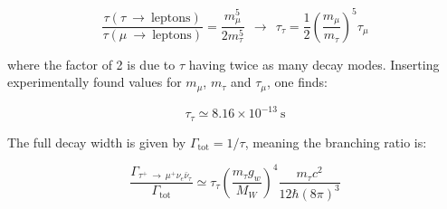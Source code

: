 \documentclass[11pt,a4paper]{article}
\begin{document}
\begin{equation}
	\frac{\tau(\tau\:\rightarrow\:\text{leptons})}{\tau(\mu\:\rightarrow\:\text{leptons})} = \frac{m_\mu^5}{2m_\tau^5} \:\:\longrightarrow\:\: \tau_\tau = \frac{1}{2}\left(\frac{m_\mu}{m_\tau}\right)^5\tau_\mu
\end{equation}

where the factor of 2 is due to $\tau$ having twice as many decay modes. Inserting experimentally found values for $m_\mu$, $m_\tau$ and $\tau_\mu$, one finds:

\begin{equation}
	\tau_\tau \simeq 8.16\times 10^{-13}\:\text{s}
\end{equation}

The full decay width is given by $\Gamma_{\text{tot}} = 1/\tau$, meaning the branching ratio is:

\begin{equation}
	\frac{\Gamma_{\tau^+ \:\rightarrow\: \mu^+\nu_e\bar{\nu}_\tau}}{\Gamma_{\text{tot}}} \simeq \tau_\tau\left(\frac{m_\tau g_w}{M_W}\right)^4 \frac{m_\tau c^2}{12\hbar(8\pi)^3}
\end{equation}


\end{document}
